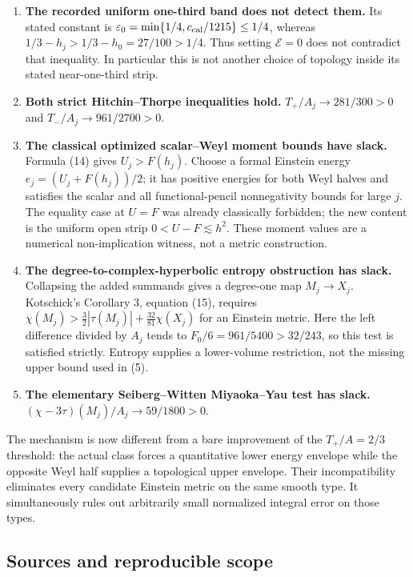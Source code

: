 \documentclass[
  11pt,
]{article}
\providecommand{\tightlist}{%
  \setlength{\itemsep}{0pt}\setlength{\parskip}{0pt}}
\begin{document}
\begin{enumerate}
\def\labelenumi{\arabic{enumi}.}
\tightlist
\item
  \textbf{The recorded uniform one-third band does not detect them.} Its
  stated constant is
  \(\varepsilon_0=\min\{1/4,c_{\rm cal}/1215\}\le1/4\), whereas
  \(1/3-h_j>1/3-h_0=27/100>1/4\). Thus setting \(\mathcal E=0\) does not
  contradict that inequality. In particular this is not another choice
  of topology inside its stated near-one-third strip.
\item
  \textbf{Both strict Hitchin--Thorpe inequalities hold.}
  \(T_+/A_j\to281/300>0\) and \(T_-/A_j\to961/2700>0\).
\item
  \textbf{The classical optimized scalar--Weyl moment bounds have
  slack.} Formula (14) gives \(U_j>F(h_j)\). Choose a formal Einstein
  energy \(e_j=(U_j+F(h_j))/2\); it has positive energies for both Weyl
  halves and satisfies the scalar and all functional-pencil
  nonnegativity bounds for large \(j\). The equality case at \(U=F\) was
  already classically forbidden; the new content is the uniform open
  strip \(0<U-F\lesssim h^2\). These moment values are a numerical
  non-implication witness, not a metric construction.
\item
  \textbf{The degree-to-complex-hyperbolic entropy obstruction has
  slack.} Collapsing the added summands gives a degree-one map
  \(M_j\to X_j\). Kotschick's Corollary 3, equation (15), requires
  \(\chi(M_j)>\frac32|\tau(M_j)|+\frac{32}{81}\chi(X_j)\) for an
  Einstein metric. Here the left difference divided by \(A_j\) tends to
  \(F_0/6=961/5400>32/243\), so this test is satisfied strictly. Entropy
  supplies a lower-volume restriction, not the missing upper bound used
  in (5).
\item
  \textbf{The elementary Seiberg--Witten Miyaoka--Yau test has slack.}
  \((\chi-3\tau)(M_j)/A_j\to59/1800>0\).
\end{enumerate}

The mechanism is now different from a bare improvement of the
\(T_+/A=2/3\) threshold: the actual class forces a quantitative lower
energy envelope while the opposite Weyl half supplies a topological
upper envelope. Their incompatibility eliminates every candidate
Einstein metric on the same smooth type. It simultaneously rules out
arbitrarily small normalized integral error on those types.

\hypertarget{sources-and-reproducible-scope}{%
\subsection{Sources and reproducible
scope}\label{sources-and-reproducible-scope}}
\end{document}
